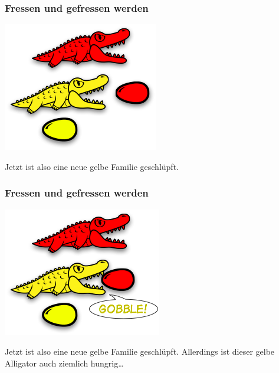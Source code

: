 \documentclass{beamer}
\begin{document}

\begin{frame}
\begin{multicols}{2}
\frametitle{Fressen und gefressen werden}

\begin{center}
\includegraphics[scale=0.45]{eating_6.png} 
\end{center}
\columnbreak

Jetzt ist also eine neue gelbe Familie geschlüpft. 

\end{multicols}
\end{frame}



\begin{frame}
\begin{multicols}{2}
\frametitle{Fressen und gefressen werden}

\begin{center}
\includegraphics[scale=0.45]{eating_7.png} 
\end{center}
\columnbreak

Jetzt ist also eine neue gelbe Familie geschlüpft. Allerdings ist dieser gelbe Alligator auch ziemlich hungrig\dots

\end{multicols}
\end{frame}
\end{document}
